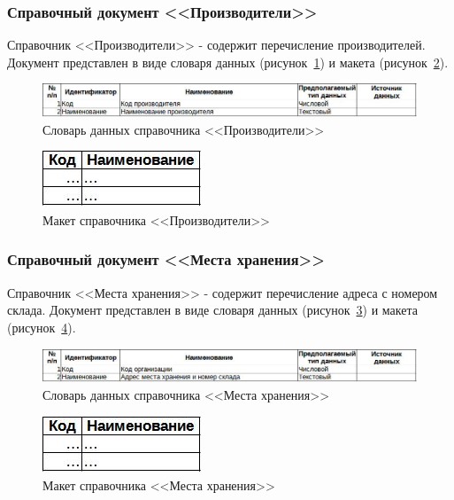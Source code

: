 \subsubsection{Справочный документ <<Производители>>}

Справочник <<Производители>> - содержит перечисление производителей.
Документ представлен в виде словаря данных (рисунок~\ref{fig:CP_Proizv_tipi})
и макета (рисунок~\ref{fig:CP_Proizv_maket}).

\begin{figure}[!h]
    \centering
    \includegraphics[width=14cm]
        {_docs/СП_Произв_типы.jpg}
    \caption{Словарь данных справочника <<Производители>>}
    \label{fig:CP_Proizv_tipi}
\end{figure}

\begin{figure}[!h]
    \centering
    \includegraphics[]
        {_docs/СП_Произв_макет.jpg}
    \caption{Макет справочника <<Производители>>}
    \label{fig:CP_Proizv_maket}
\end{figure}

\subsubsection{Справочный документ <<Места хранения>>}

Справочник <<Места хранения>> - содержит перечисление адреса с номером склада.
Документ представлен в виде словаря данных (рисунок~\ref{fig:CP_MestaXran_tipi})
и макета (рисунок~\ref{fig:CP_MestaXran_maket}).

\begin{figure}[!h]
    \centering
    \includegraphics[width=14cm]
        {_docs/СП_МестаХран_типы.jpg}
    \caption{Словарь данных справочника <<Места хранения>>}
    \label{fig:CP_MestaXran_tipi}
\end{figure}

\begin{figure}[!h]
    \centering
    \includegraphics[]
        {_docs/СП_МестаХран_макет.jpg}
    \caption{Макет справочника <<Места хранения>>}
    \label{fig:CP_MestaXran_maket}
\end{figure}

